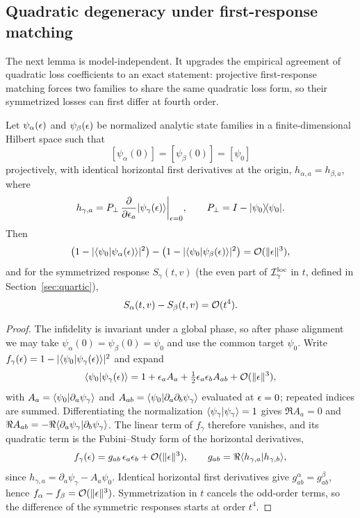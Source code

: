 \subsection{Quadratic degeneracy under first-response matching}

The next lemma is model-independent. It upgrades the empirical agreement of quadratic loss
coefficients to an exact statement: projective first-response matching forces two families
to share the same quadratic loss form, so their symmetrized losses can first differ at
fourth order.

\begin{lemma}%
\label{lem:quadratic}
Let $\psi_{\alpha}(\epsilon)$ and $\psi_{\beta}(\epsilon)$ be normalized analytic state families in
a finite-dimensional Hilbert space such that
\[
[\psi_{\alpha}(0)]=[\psi_{\beta}(0)]=[\psi_{0}]
\]
projectively, with identical horizontal first derivatives at the origin,
$h_{\alpha,a}=h_{\beta,a}$, where
\[
h_{\gamma,a}=P_{\perp}\,
\frac{\partial}{\partial\epsilon_{a}}\lvert \psi_{\gamma}(\epsilon) \rangle\bigg|_{\epsilon=0},
\qquad P_{\perp}=I-\lvert \psi_{0} \rangle\!\langle \psi_{0} \rvert.
\]
Then
\[
\bigl(1-\lvert\langle \psi_{0} \vert \psi_{\alpha}(\epsilon) \rangle\rvert^{2}\bigr)
-\bigl(1-\lvert\langle \psi_{0} \vert \psi_{\beta}(\epsilon) \rangle\rvert^{2}\bigr)
=\mathcal{O}(\lVert\epsilon\rVert^{3}),
\]
and for the symmetrized response $S_{\gamma}(t,v)$ (the even part of
$\mathcal{I}^{\mathrm{loc}}_{\gamma}$ in $t$, defined in Section~\ref{sec:quartic}),
\[
S_{\alpha}(t,v)-S_{\beta}(t,v)=\mathcal{O}(t^{4}).
\]
\end{lemma}

\begin{proof}
The infidelity is invariant under a global phase, so after phase alignment we may take
$\psi_{\alpha}(0)=\psi_{\beta}(0)=\psi_{0}$ and use the common target $\psi_{0}$. Write
$f_{\gamma}(\epsilon)=1-\lvert\langle \psi_{0} \vert \psi_{\gamma}(\epsilon) \rangle\rvert^{2}$ and expand
\[
\langle \psi_{0} \vert \psi_{\gamma}(\epsilon) \rangle
=1+\epsilon_{a}A_{a}+\tfrac{1}{2}\epsilon_{a}\epsilon_{b}A_{ab}+\mathcal{O}(\lVert\epsilon\rVert^{3}),
\]
with $A_{a}=\langle \psi_{0} \vert \partial_{a}\psi_{\gamma} \rangle$ and
$A_{ab}=\langle \psi_{0} \vert \partial_{a}\partial_{b}\psi_{\gamma} \rangle$ evaluated at $\epsilon=0$;
repeated indices are summed. Differentiating the normalization
$\langle \psi_{\gamma} \vert \psi_{\gamma} \rangle=1$ gives $\Re A_{a}=0$ and
$\Re A_{ab}=-\Re\langle \partial_{a}\psi_{\gamma} \vert \partial_{b}\psi_{\gamma} \rangle$. The linear
term of $f_{\gamma}$ therefore vanishes, and its quadratic term is the Fubini--Study form
of the horizontal derivatives,
\[
f_{\gamma}(\epsilon)=g_{ab}\,\epsilon_{a}\epsilon_{b}+\mathcal{O}(\lVert\epsilon\rVert^{3}),
\qquad g_{ab}=\Re\langle h_{\gamma,a} \vert h_{\gamma,b} \rangle,
\]
since $h_{\gamma,a}=\partial_{a}\psi_{\gamma}-A_{a}\psi_{0}$. Identical horizontal first
derivatives give $g^{\alpha}_{ab}=g^{\beta}_{ab}$, hence
$f_{\alpha}-f_{\beta}=\mathcal{O}(\lVert\epsilon\rVert^{3})$. Symmetrization in $t$ cancels the
odd-order terms, so the difference of the symmetric responses starts at order $t^{4}$.
\end{proof}

